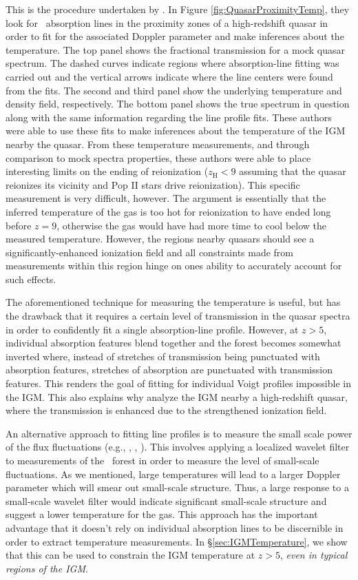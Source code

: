 This is the procedure undertaken by \cite{BoltonQuasar}. In Figure \ref{fig:QuasarProximityTemp}, they look for \lya\ absorption lines in the proximity zones of a high-redshift quasar in order to fit for the associated Doppler parameter and make inferences about the temperature. The top panel shows the fractional transmission for a mock quasar spectrum. The dashed curves indicate regions where absorption-line fitting was carried out and the vertical arrows indicate where the line centers were found from the fits. The second and third panel show the underlying temperature and density field, respectively. The bottom panel shows the true spectrum in question along with the same information regarding the line profile fits. These authors were able to use these fits to make inferences about the temperature of the IGM nearby the quasar. From these temperature measurements, and through comparison to mock spectra properties, these authors were able to place interesting limits on the ending of reionization ($z_{\text{H}} <  9$ assuming that the quasar reionizes its vicinity and Pop II stars drive reionization). This specific measurement is very difficult, however. The argument is essentially that the inferred temperature of the gas is too hot for reionization to have ended long before $z = 9$, otherwise the gas would have had more time to cool below the measured temperature. However, the regions nearby quasars should see a significantly-enhanced ionization field and all constraints made from measurements within this region hinge on ones ability to accurately account for such effects. 


The aforementioned technique for measuring the temperature is useful, but has the drawback that it requires a certain level of transmission in the quasar spectra in order to confidently fit a single absorption-line profile. However, at $z > 5$, individual absorption features blend together and the forest becomes somewhat inverted where, instead of stretches of transmission being punctuated with absorption features, stretches of absorption are punctuated with transmission features. This renders the goal of fitting for individual Voigt profiles impossible in the IGM. This also explains why \cite{BoltonQuasar} analyze the IGM  nearby a high-redshift quasar, where the transmission is enhanced due to the strengthened ionization field. 


An alternative approach to fitting line profiles is to measure the small scale power of the flux fluctuations (e.g., \citealt{Lidz2010}, \citealt{Theuns2002a}, \citealt{zaldarriaga2002searching}). This involves applying a localized wavelet filter to measurements of the \lya\ forest in order to measure the level of small-scale fluctuations. As we mentioned, large temperatures will lead to a larger Doppler parameter which will smear out small-scale structure. Thus, a large response to a small-scale wavelet filter would indicate significant small-scale structure and suggest a lower temperature for the gas. This approach has the important advantage that it doesn't rely on individual absorption lines to be discernible in order to extract temperature measurements. In \S \ref{sec:IGMTemperature}, we show that this can be used to constrain the IGM temperature at $z > 5$, \textit{even in typical regions of the IGM}.

